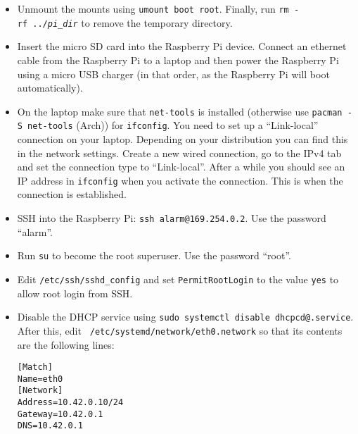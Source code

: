 \documentclass{article}
\newcommand{\arch}{{\color{red} (Arch)}}
\begin{document}
\begin{itemize}
          {\tt cd boot} \\
          {\tt cp cmdline.txt cmdline.txt.bak} \\
          {\tt vim cmdline.txt}

          In that file, add a space and {\tt ip=169.254.0.2} at the end of the 
          line. Do not create a new line for that. Save the file and {\tt sync} 
          again.
    \item Unmount the mounts using {\tt umount boot root}. Finally, run {\tt rm 
          -rf~../\emph{pi\_dir}} to remove the temporary directory.
    \item Insert the micro SD card into the Raspberry Pi device. Connect an 
          ethernet cable from the Raspberry Pi to a laptop and then power the 
          Raspberry Pi using a micro USB charger (in that order, as the 
          Raspberry Pi will boot automatically).
    \item On the laptop make sure that {\tt net-tools} is installed (otherwise 
          use {\tt pacman -S net-tools} \arch{}) for {\tt ifconfig}. You need 
          to set up a ``Link-local'' connection on your laptop. Depending on 
          your distribution you can find this in the network settings. Create 
          a new wired connection, go to the IPv4 tab and set the connection 
          type to ``Link-local''. After a while you should see an IP address in 
          {\tt ifconfig} when you activate the connection. This is when the 
          connection is established.
    \item SSH into the Raspberry Pi: {\tt ssh alarm@169.254.0.2}. Use the 
          password ``alarm''.
    \item Run {\tt su} to become the root superuser. Use the password ``root''.
    \item Edit {\tt /etc/ssh/sshd\_config} and set {\tt PermitRootLogin} to the 
          value {\tt yes} to allow root login from SSH\@.
    \item Disable the DHCP service using {\tt sudo systemctl disable 
          dhcpcd@.service}. After this, edit {\tt 
          /etc/systemd/network/eth0.network} so that its contents are the 
          following lines:

          {\tt [Match]} \\
          {\tt Name=eth0}
          \vspace{\baselineskip} \\
          {\tt [Network]} \\
          {\tt Address=10.42.0.10/24} \\
          {\tt Gateway=10.42.0.1} \\
          {\tt DNS=10.42.0.1}


\end{itemize}
\end{document}
